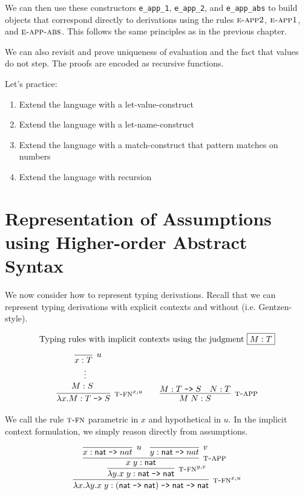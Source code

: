 We can then use these constructors \lstinline!e_app_1!,
\lstinline!e_app_2!, and \lstinline!e_app_abs! to build objects that
correspond directly to derivations using the rules $\textsc{e-app2}$,
$\textsc{e-app1}$, and  $\textsc{e-app-abs}$. This follows the same principles as in the
previous chapter. 

We can also revisit and prove uniqueness of evaluation and the fact that values
do not step. The proofs are encoded as recursive functions. 

Let's practice:

\begin{enumerate}
\item Extend the language with a let-value-construct
\item Extend the language with a let-name-construct
\item Extend the language with a match-construct that pattern matches on numbers
\item Extend the language with recursion
\end{enumerate}



\section{Representation of Assumptions using Higher-order Abstract Syntax} 
We now consider how to represent typing derivations. Recall that we can
represent typing derivations with explicit contexts and without
(i.e. Gentzen-style).

\[
\begin{array}{c}
\multicolumn{1}{l}{\mbox{Typing rules with implicit contexts using the judgment \fbox{$M:T$}}} \\[1em]
\infer[\TFn^{x,u}]{\lambda x.M : T \arrow S}{
  \begin{array}{c}
  \infer[u]{x:T}{} \\
  \vdots~~\\
  M : S~~~~   
  \end{array}
}  
\qquad
\infer[\TApp]{M\;N : S}{M : T \arrow S & N:T}
\end{array}
\]

We call the rule $\textsc{t-fn}$ parametric in $x$ and hypothetical in $u$. 
In the implicit context formulation, we simply reason directly from
assumptions. 


\[
\infer[\TFn^{x,u}]{\lambda x. \lambda y. x\;y : (\nat \arrow \nat) \arrow \nat \arrow \nat}
{\infer[\TFn^{y,v}]{\lambda y.x\;y : \nat \arrow \nat}{
 \infer[\TApp]{x\;y : \nat}
   {\infer[u]{x:\nat \arrow nat}{} & 
    \infer[v]{y:\nat \arrow nat}{}
   }
 }
}
\]

